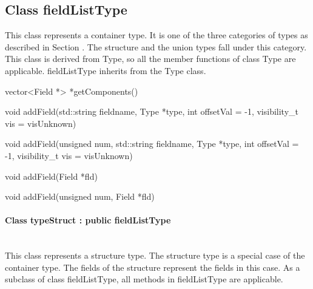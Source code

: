 \subsection{Class fieldListType}

This class represents a container type. It is one of the three categories of types as described in Section . The structure and the union types fall under this category. This class is derived from Type, so all the member functions of class Type are applicable. fieldListType inherits from the Type class.


\begin{apient}
vector<Field *> *getComponents()
\end{apient}

\begin{apient}
void addField(std::string fieldname, Type *type, int offsetVal = -1, 
              visibility_t vis = visUnknown)
\end{apient}

\begin{apient}
void addField(unsigned num, std::string fieldname, Type *type, int offsetVal = -1, 
              visibility_t vis = visUnknown)         
\end{apient}

\begin{apient}
void addField(Field *fld)
\end{apient}

\begin{apient}
void addField(unsigned num, Field *fld)
\end{apient}

\paragraph{Class typeStruct : public fieldListType}
\mbox{ }\\

This class represents a structure type. The structure type is a special case of
the container type. The fields of the structure represent the fields in this
case. As a subclass of class fieldListType, all methods in fieldListType are
applicable.



